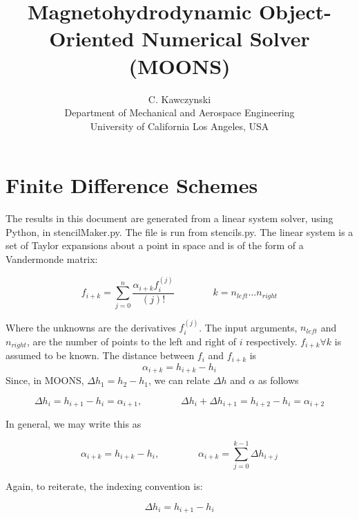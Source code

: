 \documentclass[landscape]{article}
\begin{document}
\doublespacing
\title{Magnetohydrodynamic Object-Oriented Numerical Solver (MOONS)}
\author{C. Kawczynski \\
Department of Mechanical and Aerospace Engineering \\
University of California Los Angeles, USA\\}
\maketitle

\section{Finite Difference Schemes}

The results in this document are generated from a linear system solver, using Python, in stencilMaker.py. The file is run from stencils.py. The linear system is a set of Taylor expansions about a point in space and is of the form of a Vandermonde matrix:

\begin{equation}
	f_{i+k}
	=
	\sum_{j=0}^n
	\frac{\alpha_{i+k} f_{i}^{(j)}}{(j)!}
	\qquad \qquad
	k = n_{left} \dots n_{right}
\end{equation}

Where the unknowns are the derivatives $f_i^{(j)}$. The input arguments, $n_{left}$ and $n_{right}$, are the number of points to the left and right of $i$ respectively. $f_{i+k}\forall k$ is assumed to be known. The distance between $f_{i}$ and $f_{i+k}$ is
\begin{equation}
	\alpha_{i+k} 
	=
	h_{i+k} - h_{i}
\end{equation}
Since, in MOONS, $\Delta h_1 = h_2 - h_1$, we can relate $\Delta h$ and $\alpha$ as follows

\begin{equation}
	\Delta h_{i} = h_{i+1} - h_{i} = \alpha_{i+1}
	,\qquad \qquad
	\Delta h_{i} + \Delta h_{i+1} = h_{i+2} - h_{i} = \alpha_{i+2}
\end{equation}

In general, we may write this as

\begin{equation}
	\alpha_{i+k} = h_{i+k} - h_{i}
	,\qquad \qquad
	\alpha_{i+k} = \sum_{j=0}^{k-1} \Delta h_{i+j}
\end{equation}

Again, to reiterate, the indexing convention is:

\begin{equation}
	\boxed{
	\Delta h_{i}
	=
	h_{i+1} - h_{i}
	}
\end{equation}
\end{document}
